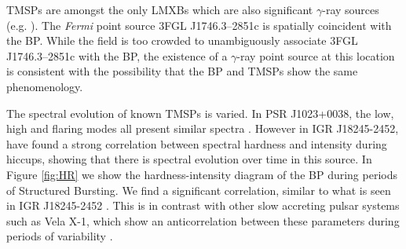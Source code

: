 \par TMSPs are amongst the only LMXBs which are also significant $\gamma$-ray sources (e.g. \citealp{Hill_XSS}). The \textit{Fermi} point source 3FGL J1746.3--2851c is spatially coincident with the BP. While the field is too crowded to unambiguously associate 3FGL J1746.3--2851c with the BP, the existence of a $\gamma$-ray point source at this location is consistent with the possibility that the BP and TMSPs show the same phenomenology.

\par The spectral evolution of known TMSPs is varied. In PSR J1023+0038, the low, high and flaring modes all present similar spectra \citep{Bogdanov_TMSPVar}. However in IGR J18245-2452, \citealp{Ferrigno_TMSPVar} have found a strong correlation between spectral hardness and intensity during hiccups, showing that there is spectral evolution over time in this source. In Figure \ref{fig:HR} we show the hardness-intensity diagram of the BP during periods of Structured Bursting. We find a significant correlation, similar to what is seen in IGR J18245-2452 \citep{Ferrigno_TMSPVar}. This is in contrast with other slow accreting pulsar systems such as Vela X-1, which show an anticorrelation between these parameters during periods of variability \citep{Kreykenbohm_Vela}.






